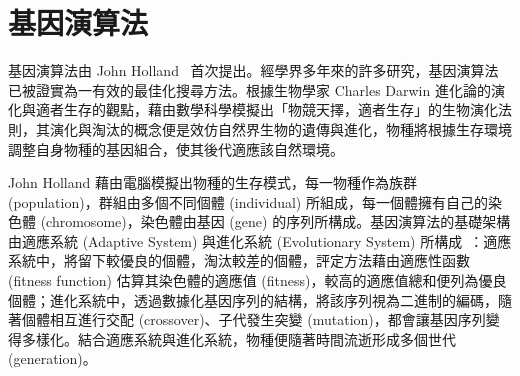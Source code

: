 

\section{基因演算法}
\label{sec:relatedworks-ga}

基因演算法由 John Holland~\cite{holland1992adaptation} 首次提出。經學界多年來的許多研究，基因演算法已被證實為一有效的最佳化搜尋方法。根據生物學家 Charles Darwin 進化論的演化與適者生存的觀點，藉由數學科學模擬出「物競天擇，適者生存」的生物演化法則，其演化與淘汰的概念便是效仿自然界生物的遺傳與進化，物種將根據生存環境調整自身物種的基因組合，使其後代適應該自然環境。

John Holland 藉由電腦模擬出物種的生存模式，每一物種作為族群 (population)，群組由多個不同個體 (individual) 所組成，每一個體擁有自己的染色體 (chromosome)，染色體由基因 (gene) 的序列所構成。基因演算法的基礎架構由適應系統 (Adaptive System) 與進化系統 (Evolutionary System) 所構成~\cite{holland1992adaptation}：適應系統中，將留下較優良的個體，淘汰較差的個體，評定方法藉由適應性函數 (fitness function) 估算其染色體的適應值 (fitness)，較高的適應值總和便列為優良個體；進化系統中，透過數據化基因序列的結構，將該序列視為二進制的編碼，隨著個體相互進行交配 (crossover)、子代發生突變 (mutation)，都會讓基因序列變得多樣化。結合適應系統與進化系統，物種便隨著時間流逝形成多個世代 (generation)。


